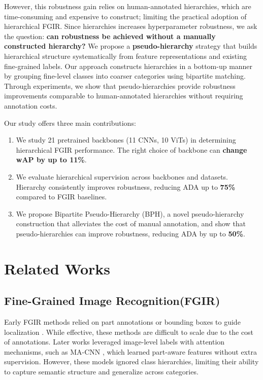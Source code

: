 \documentclass[conference]{IEEEtran}
\begin{document}
However, this robustness gain relies on human-annotated hierarchies, which are time-consuming and expensive to construct; limiting the practical adoption of hierarchical FGIR. Since hierarchies increases hyperparameter robustness, we ask the question: \textbf{can robustness be achieved without a manually constructed hierarchy?} We propose a \textbf{pseudo-hierarchy} strategy that builds hierarchical structure systematically from feature representations and existing fine-grained labels. Our approach constructs hierarchies in a bottom-up manner by grouping fine-level classes into coarser categories using bipartite matching. Through experiments, we show that pseudo-hierarchies provide robustness improvements comparable to human-annotated hierarchies without requiring annotation costs.

Our study offers three main contributions: 
\begin{enumerate} [topsep=3pt, itemsep=2pt, parsep=1pt]
    \item We study 21 pretrained backbones (11 CNNs, 10 ViTs) in determining hierarchical FGIR performance. The right choice of backbone can \textbf{change wAP by up to 11\%}.
    \item We evaluate hierarchical supervision across backbones and datasets. Hierarchy consistently improves robustness, reducing ADA up to \textbf{75\%} compared to FGIR baselines.
    \item We propose Bipartite Pseudo-Hierarchy (BPH), a novel pseudo-hierarchy construction that alleviates the cost of manual annotation, and show that pseudo-hierarchies can improve robustness, reducing ADA by up to \textbf{50\%}.
\end{enumerate}

\section{Related Works}
\subsection{Fine-Grained Image Recognition(FGIR)}
Early FGIR methods relied on part annotations or bounding boxes to guide localization \cite{zhang_part-based_2014}. While effective, these methods are difficult to scale due to the cost of annotations.  Later works leveraged image-level labels with attention mechanisms, such as MA-CNN \cite{zheng_learning_2017}, which learned part-aware features without extra supervision. However, these models ignored class hierarchies, limiting their ability to capture semantic structure and generalize across categories.
\end{document}
